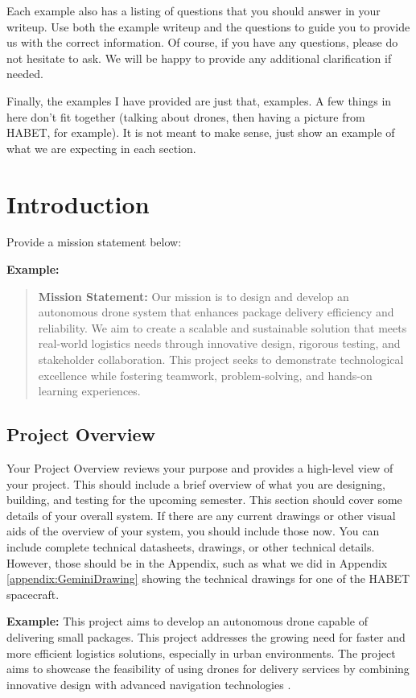 Each example also has a listing of questions that you should answer in your writeup. Use both the example writeup and the questions to guide you to provide us with the correct information. Of course, if you have any questions, please do not hesitate to ask. We will be happy to provide any additional clarification if needed. 

Finally, the examples I have provided are just that, examples. A few things in here don't fit together (talking about drones, then having a picture from HABET, for example). It is not meant to make sense, just show an example of what we are expecting in each section.

\newpage

\section{Introduction}
Provide a mission statement below:

\textbf{Example:} \\

\begin{quote}
\textbf{Mission Statement:} Our mission is to design and develop an autonomous drone system that enhances package delivery efficiency and reliability. We aim to create a scalable and sustainable solution that meets real-world logistics needs through innovative design, rigorous testing, and stakeholder collaboration. This project seeks to demonstrate technological excellence while fostering teamwork, problem-solving, and hands-on learning experiences.
\end{quote}

\subsection{Project Overview}
Your Project Overview reviews your purpose and provides a high-level view of your project. This should include a brief overview of what you are designing, building, and testing for the upcoming semester. This section should cover some details of your overall system. If there are any current drawings or other visual aids of the overview of your system, you should include those now. You can include complete technical datasheets, drawings, or other technical details. However, those should be in the Appendix, such as what we did in Appendix \ref{appendix:GeminiDrawing} showing the technical drawings for one of the HABET spacecraft. 

\textbf{Example:}
This project aims to develop an autonomous drone capable of delivering small packages. This project addresses the growing need for faster and more efficient logistics solutions, especially in urban environments. The project aims to showcase the feasibility of using drones for delivery services by combining innovative design with advanced navigation technologies \cite{SP8112}.

